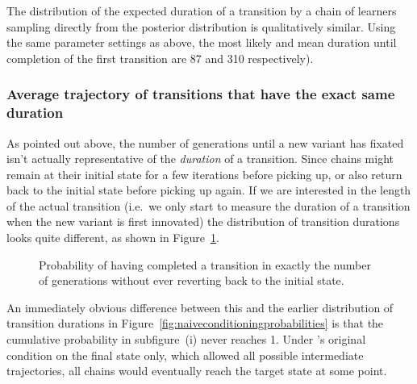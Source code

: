 The distribution of the expected duration of a transition by a chain of learners sampling directly from the posterior distribution is qualitatively similar. Using the same parameter settings as above, the most likely and mean duration until completion of the first transition are 87 and 310 respectively).


\subsubsection{Average trajectory of transitions that have the exact same duration}

As pointed out above, the number of generations until a new variant has fixated isn't actually representative of the \emph{duration} of a transition. Since chains might remain at their initial state for a few iterations before picking up, or also return back to the initial state before picking up again. If we are interested in the length of the actual transition (i.e.~we only start to measure the duration of a transition when the new variant is first innovated) the distribution of transition durations looks quite different, as shown in Figure~\ref{fig:complexconditioningprobabilities}.

\begin{figure}[htbp]

{\centering {}

}

\caption[Probability of having completed a transition in exactly the number of generations without ever reverting back to the initial state]{Probability of having completed a transition in exactly the number of generations without ever reverting back to the initial state.}\label{fig:complexconditioningprobabilities}
\end{figure}



An immediately obvious difference between this and the earlier distribution of transition durations in Figure~\ref{fig:naiveconditioningprobabilities} is that the cumulative probability in subfigure~(i) never reaches 1. Under \citet{Reali2010}'s original condition on the final state only, which allowed all possible intermediate trajectories, all chains would eventually reach the target state at some point.

